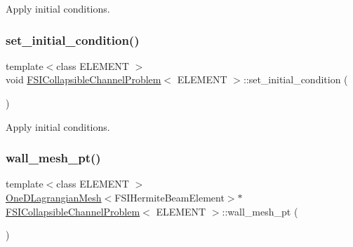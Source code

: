 Apply initial conditions. 

\mbox{\label{classFSICollapsibleChannelProblem_afdd6752cb134fd09ee8830158ed557b2}} 
\subsubsection{\texorpdfstring{set\+\_\+initial\+\_\+condition()}{set\_initial\_condition()}\hspace{0.1cm}{\footnotesize\ttfamily [4/4]}}
{\footnotesize\ttfamily template$<$class E\+L\+E\+M\+E\+NT $>$ \\
void \hyperlink{classFSICollapsibleChannelProblem}{F\+S\+I\+Collapsible\+Channel\+Problem}$<$ E\+L\+E\+M\+E\+NT $>$\+::set\+\_\+initial\+\_\+condition (\begin{DoxyParamCaption}{ }\end{DoxyParamCaption})}



Apply initial conditions. 

\mbox{\label{classFSICollapsibleChannelProblem_ae8b71da8da82f3c52387052ce400b930}} 
\subsubsection{\texorpdfstring{wall\+\_\+mesh\+\_\+pt()}{wall\_mesh\_pt()}\hspace{0.1cm}{\footnotesize\ttfamily [1/4]}}
{\footnotesize\ttfamily template$<$class E\+L\+E\+M\+E\+NT $>$ \\
\hyperlink{classoomph_1_1OneDLagrangianMesh}{One\+D\+Lagrangian\+Mesh}$<$F\+S\+I\+Hermite\+Beam\+Element$>$$\ast$ \hyperlink{classFSICollapsibleChannelProblem}{F\+S\+I\+Collapsible\+Channel\+Problem}$<$ E\+L\+E\+M\+E\+NT $>$\+::wall\+\_\+mesh\+\_\+pt (\begin{DoxyParamCaption}{ }\end{DoxyParamCaption})\hspace{0.3cm}{\ttfamily [inline]}}



